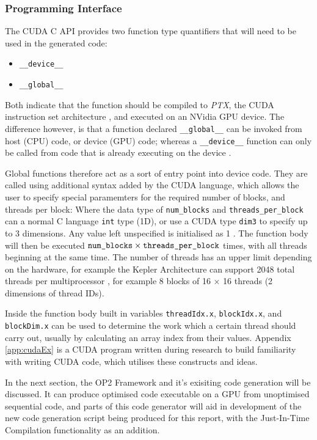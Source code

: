 \subsubsection{Programming Interface}
The CUDA C API provides two function type quantifiers that will need to be used in the generated code:
\begin{itemize}
\vspace{-.5cm}
\setlength{\itemsep}{0pt}%
\setlength{\parskip}{0pt}%
\item{\verb|__device__|}
\item{\verb|__global__|}
\vspace{-.5cm}
\end{itemize}
Both indicate that the function should be compiled to \textit{PTX}, the CUDA instruction set architecture \cite[p15]{guide}, and executed on an NVidia GPU device. The difference however, is that a function declared \verb|__global__| can be invoked from host (CPU) code, or device (GPU) code; whereas a \verb|__device__| function can only be called from code that is already executing on the device \cite[p81]{guide}.
\par
Global functions therefore act as a sort of entry point into device code. They are called using additional syntax added by the CUDA language, which allows the user to specify special paramemters for the required number of blocks, and threads per block:
\noindent Where the data type of \verb|num_blocks| and \verb|threads_per_block| can a normal C language \verb|int| type (1D), or use a CUDA type \verb|dim3| \cite[p9]{guide} to specify up to 3 dimensions. Any value left unspecified is initialised as 1 \cite[p87]{guide}. The function body will then be executed $\verb|num_blocks| \times \verb|threads_per_block|$ times, with all threads beginning at the same time. The number of threads has an upper limit depending on the hardware, for example the Kepler Architecture can support 2048 total threads per multiprocessor \cite{kepler}, for example 8 blocks of 16 $\times$ 16 threads (2 dimensions of thread IDs).
\par
Inside the function body built in variables \verb|threadIdx.x|, \verb|blockIdx.x|, and \verb|blockDim.x| can be used to determine the work which a certain thread should carry out, usually by calculating an array index from their values. Appendix \ref{app:cudaEx} is a CUDA program written during research to build familiarity with writing CUDA code, which utilises these constructs and ideas.
\par
In the next section, the OP2 Framework and it's exisiting code generation will be discussed. It can produce optimised code executable on a GPU from unoptimised sequential code, and parts of this code generator will aid in development of the new code generation script being produced for this report, with the Just-In-Time Compilation functionality as an addition.


